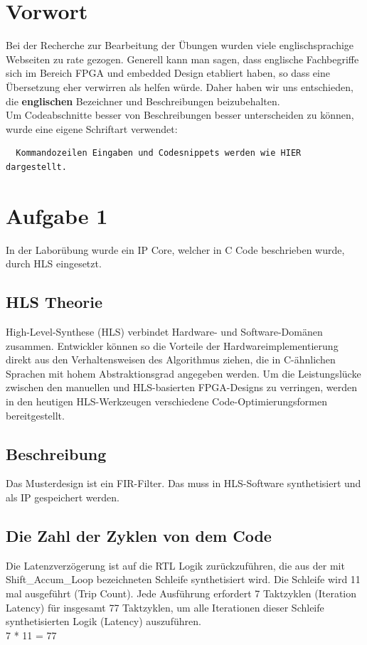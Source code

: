 \section{Vorwort}
Bei der Recherche zur Bearbeitung der Übungen wurden viele englischsprachige Webseiten zu rate gezogen. Generell kann man sagen, dass englische Fachbegriffe sich im Bereich FPGA und embedded Design etabliert haben, so dass eine Übersetzung eher verwirren als helfen würde. Daher haben wir uns entschieden, die \textbf{englischen} Bezeichner und Beschreibungen beizubehalten.\\
Um Codeabschnitte besser von Beschreibungen besser unterscheiden zu können, wurde eine eigene Schriftart verwendet:
\begin{verbatim}
  Kommandozeilen Eingaben und Codesnippets werden wie HIER dargestellt.
\end{verbatim}

\section{Aufgabe 1} \label{ex1}
In der Laborübung wurde ein IP Core, welcher in C Code beschrieben wurde, durch HLS eingesetzt.


\subsection {HLS Theorie}
High-Level-Synthese (HLS) verbindet Hardware- und Software-Domänen zusammen. Entwickler können so die Vorteile der Hardwareimplementierung direkt aus den Verhaltensweisen des Algorithmus ziehen, die in C-ähnlichen Sprachen mit hohem Abstraktionsgrad angegeben werden. Um die Leistungslücke zwischen den manuellen und HLS-basierten FPGA-Designs zu verringen, werden in den heutigen HLS-Werkzeugen verschiedene Code-Optimierungsformen bereitgestellt. \\


\subsection {Beschreibung}
Das Musterdesign ist ein FIR-Filter. Das muss in HLS-Software synthetisiert und als IP gespeichert werden.\\

\subsection {Die Zahl der Zyklen von dem Code}
Die Latenzverzögerung ist auf die RTL Logik zurückzuführen, die aus der mit Shift\_Accum\_Loop bezeichneten Schleife synthetisiert wird. Die Schleife wird 11 mal ausgeführt (Trip Count). Jede Ausführung erfordert 7 Taktzyklen (Iteration Latency) für insgesamt 77 Taktzyklen, um alle Iterationen dieser Schleife synthetisierten Logik (Latency) auszuführen.\\
 7 * 11 = 77 \\

